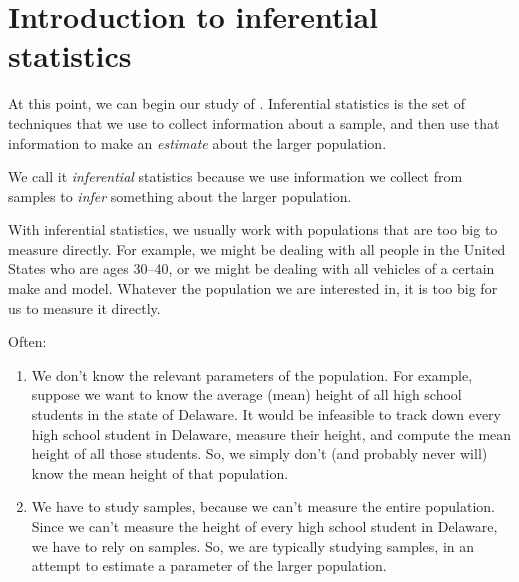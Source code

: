 \documentclass[../../../main.tex]{subfiles}
\begin{document}
\chapter{Introduction to inferential statistics}

At this point, we can begin our study of . Inferential statistics is the set of techniques that we use to collect information about a sample, and then use that information to make an \emph{estimate} about the larger population. 

We call it \emph{inferential} statistics because we use information we collect from samples to \emph{infer} something about the larger population.

With inferential statistics, we usually work with populations that are too big to measure directly. For example, we might be dealing with all people in the United States who are ages 30--40, or we might be dealing with all vehicles of a certain make and model. Whatever the population we are interested in, it is too big for us to measure it directly.

Often:

\begin{enumerate}

  \item We don't know the relevant parameters of the population. For example, suppose we want to know the average (mean) height of all high school students in the state of Delaware. It would be infeasible to track down every high school student in Delaware, measure their height, and compute the mean height of all those students. So, we simply don't (and probably never will) know the mean height of that population.
  
  \item We have to study samples, because we can't measure the entire population. Since we can't measure the height of every high school student in Delaware, we have to rely on samples. So, we are typically studying samples, in an attempt to estimate a parameter of the larger population.
  
\end{enumerate}
\end{document}
